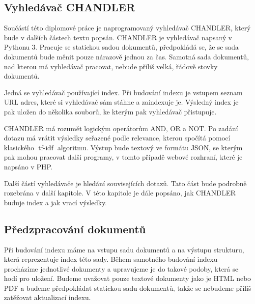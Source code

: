 \documentclass[12pt]{article}
\newcommand{\name}{CHANDLER}
\DeclareMathOperator{\tfidf}{tf-idf}
\begin{document}
\subsection{Vyhledávač \name}

Součástí této diplomové práce je naprogramovaný vyhledávač \name, který bude v dalších částech textu popsán. \name{} je vyhledávač napsaný v Pythonu 3. Pracuje se statickou sadou dokumentů, předpokládá se, že se sada dokumentů bude měnit pouze nárazově jednou za čas. Samotná sada dokumentů, nad kterou má vyhledávač pracovat, nebude příliš velká, řádově stovky dokumentů. 

Jedná se vyhledávač používající index. Při budování indexu je vstupem seznam URL adres, které si vyhledávač sám stáhne a zaindexuje je. Výsledný index je pak uložen do několika souborů, ke kterým pak vyhledávač přistupuje. 

\name{} má rozumět logickým operátorům AND, OR a NOT. Po zadání dotazu má vrátit výsledky seřazené podle relevance, kterou spočítá pomocí klasického $\tfidf$ algoritmu. Výstup bude textový ve formátu JSON, se kterým pak mohou pracovat další programy, v tomto případě webové rozhraní, které je napsáno v PHP. 

Další částí vyhledávače je hledání souvisejících dotazů. Tato část bude podrobně rozebrána v další kapitole. V této kapitole je dále popsáno, jak \name{} buduje index a jak vrací výsledky. 



\subsection{Předzpracování dokumentů}
\label{prepr}
Při budování indexu máme na vstupu sadu dokumentů a na výstupu strukturu, která reprezentuje index této sady. Během samotného budování indexu procházíme jednotlivé dokumenty a upravujeme je do takové podoby, která se hodí pro uložení. Budeme uvažovat pouze textové dokumenty jako je HTML nebo PDF a budeme předpokládat statickou sadu dokumentů, takže se nebudeme příliš zatěžovat aktualizací indexu. 
\end{document}

